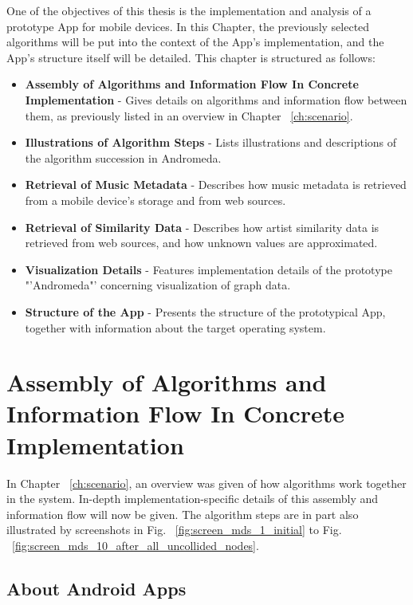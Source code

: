 One of the objectives of this thesis is the implementation and analysis of a prototype App for mobile devices. In this Chapter, the previously selected algorithms will be put into the context of the App's implementation, and the App's structure itself will be detailed. This chapter is structured as follows:

\begin{itemize}
	\item \textbf {Assembly of Algorithms and Information Flow In Concrete Implementation} - Gives details on algorithms and information flow between them, as previously listed in an overview in Chapter ~\ref{ch:scenario}.
	\item \textbf {Illustrations of Algorithm Steps} - Lists illustrations and descriptions of the algorithm succession in Andromeda.
	\item \textbf {Retrieval of Music Metadata} - Describes how music metadata is retrieved from a mobile device's storage and from web sources.
	\item \textbf {Retrieval of Similarity Data} - Describes how artist similarity data is retrieved from web sources, and how unknown values are approximated.
	\item \textbf {Visualization Details} - Features implementation details of the prototype "'Andromeda"' concerning visualization of graph data.
	\item \textbf {Structure of the App} - Presents the structure of the prototypical App, together with information about the target operating system.
\end{itemize}

\section{Assembly of Algorithms and Information Flow In Concrete Implementation}
\label{sec:algorithm-assembly}

In Chapter ~\ref{ch:scenario}, an overview was given of how algorithms work together in the system. In-depth implementation-specific details of this assembly and information flow will now be given. The algorithm steps are in part also illustrated by screenshots in Fig. ~\ref{fig:screen_mds_1_initial} to Fig. ~\ref{fig:screen_mds_10_after_all_uncollided_nodes}.

\subsection{About Android Apps}

